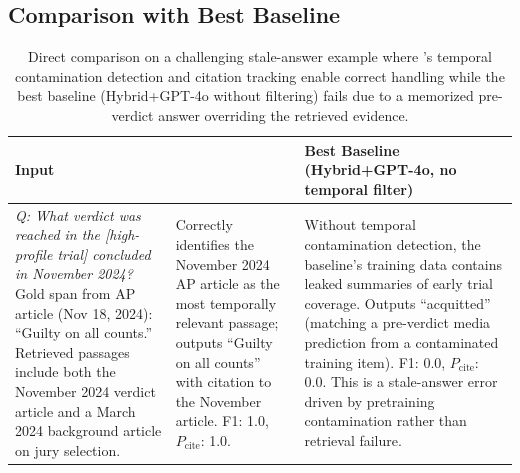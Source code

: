 \subsection{Comparison with Best Baseline}

\begin{table}[t]
\centering
\small
\begin{tabular}{p{3.0cm}p{2.8cm}p{2.8cm}}
\toprule
Input & \method{} & Best Baseline (Hybrid+GPT-4o, no temporal filter) \\
\midrule
\emph{Q: What verdict was reached in the [high-profile trial] concluded in November 2024?}
Gold span from AP article (Nov 18, 2024): ``Guilty on all counts.''
Retrieved passages include both the November 2024 verdict article and a March 2024 background article on jury selection. &
Correctly identifies the November 2024 AP article as the most temporally relevant passage; outputs ``Guilty on all counts'' with citation to the November article. F1: 1.0, $P_{\text{cite}}$: 1.0. &
Without temporal contamination detection, the baseline's training data contains leaked summaries of early trial coverage. Outputs ``acquitted'' (matching a pre-verdict media prediction from a contaminated training item). F1: 0.0, $P_{\text{cite}}$: 0.0. This is a stale-answer error driven by pretraining contamination rather than retrieval failure. \\
\bottomrule
\end{tabular}
\caption{Direct comparison on a challenging stale-answer example where \method{}'s temporal contamination detection and citation tracking enable correct handling while the best baseline (Hybrid+GPT-4o without filtering) fails due to a memorized pre-verdict answer overriding the retrieved evidence.}
\label{tab:qual-comparison}
\end{table}
